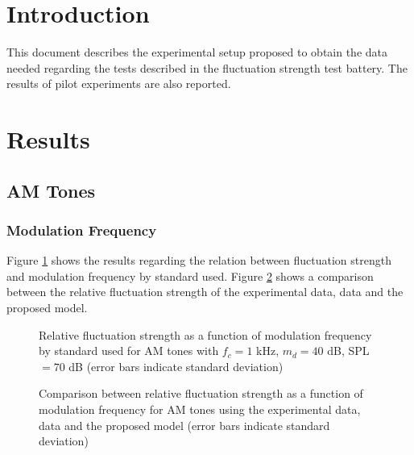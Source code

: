 \documentclass[a4paper]{article}
\begin{document}

\section{Introduction}

This document describes the experimental setup proposed to obtain the data
needed regarding the tests described in the fluctuation strength test battery.
The results of pilot experiments are also reported.

\section{Results}

\subsection{AM Tones}

\subsubsection{Modulation Frequency}

Figure \ref{fig:expresstds} shows the results regarding the relation between
fluctuation strength and modulation frequency by standard used. Figure
\ref{fig:exprescomp} shows a comparison between the relative fluctuation
strength of the experimental data, \citeauthor{Fastl2007Psychoacoustics} data
and the proposed model.

\begin{figure}[ht]
    \centering
    \resizebox{!}{10cm}{
        
    }
    \caption{Relative fluctuation strength as a function of modulation
        frequency by standard used for AM tones with $f_c = 1$ kHz, $m_d = 40$
        dB, SPL $= 70$ dB (error bars indicate standard deviation)}
    \label{fig:expresstds}
\end{figure}

\begin{figure}[ht]
    \centering
    \resizebox{!}{10cm}{
        
    }
    \caption{Comparison between relative fluctuation strength as a function of
        modulation frequency for AM tones using the experimental data,
        \citeauthor{Fastl2007Psychoacoustics} data and the proposed model
        (error bars indicate standard deviation)}
    \label{fig:exprescomp}
\end{figure}

\custombibliography
\end{document}

